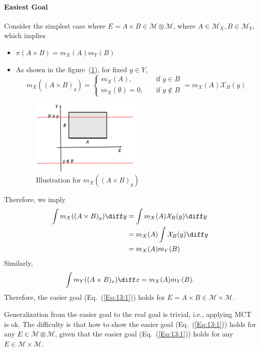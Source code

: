 \paragraph{Easiest Goal}
Consider the simplest case where 
$E=A\times B\in\mathcal{M}\otimes\mathcal{M}$, where $A\in\mathcal{M}_X,B\in\mathcal{M}_Y$,
which implies
\begin{itemize}
\item
$\pi(A\times B) = m_X(A)m_Y(B)$
\item
As shown in the figure~(\ref{fig:13:1}), for fixed $y\in Y$,
\[
m_X((A\times B)_y)
=
\left\{
\begin{aligned}
m_X(A),&\quad\text{if $y\in B$}\\
m_X(\emptyset)=0,&\quad\text{if $y\notin B$}
\end{aligned}
\right.
=
m_X(A)\mathcal{X}_B(y)
\]
\begin{figure}[H]
\centering
\includegraphics[width=0.5\textwidth]{week13/f_20}
\caption{Illustration for $m_X((A\times B)_y)$}
\label{fig:13:1}
\end{figure}
\end{itemize}
Therefore, we imply
\begin{align*}
\int m_X((A\times B)_y)\diff y  &= \int m_X(A)\mathcal{X}_B(y)\diff y\\
&=
m_X(A)\int \mathcal{X}_B(y)\diff y\\
&=m_X(A)m_Y(B)
\end{align*}
Similarly,
\[
\int m_Y((A\times B)_x)\diff x = m_X(A)m_Y(B).
\]
Therefore, the easier goal (Eq.~(\ref{Eq:13:1})) holds for $E=A\times B\in \mathcal{M}\times\mathcal{M}$.

\begin{remark}
Generalization from the easier goal to the real goal is trivial, i.e., applying MCT is ok.
The difficulty is that how to show the easier goal (Eq.~(\ref{Eq:13:1})) holds for any $E\in\mathcal{M}\otimes\mathcal{M}$, given that the easier goal (Eq.~(\ref{Eq:13:1})) holds for any $E\in \mathcal{M}\times\mathcal{M}$.
\end{remark}

